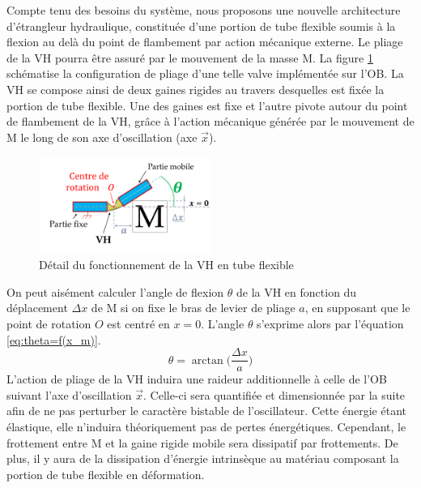 Compte tenu des besoins du système, nous proposons une nouvelle architecture d'étrangleur hydraulique, constituée d'une portion de tube flexible soumis à la flexion au delà du point de flambement par action mécanique externe. Le pliage de la VH pourra être assuré par le mouvement de la masse M. La figure \ref{fig:detail_flambement_MDOB} schématise la configuration de pliage d'une telle valve implémentée sur l'OB. La VH se compose ainsi de deux gaines rigides au travers desquelles est fixée la portion de tube flexible. Une des gaines est fixe et l'autre pivote autour du point de flambement de la VH, grâce à l'action mécanique générée par le mouvement de M le long de son axe d'oscillation (axe $\vec{x}$).
\begin{figure}[!htb]
	\begin{center}
		\captionsetup{justification=centering}
		\includegraphics[trim={2cm 2cm 3cm 1cm},clip,width=0.5\textwidth]{../Chap2/Figure/detail_flambement_MDB.pdf}
		\caption{Détail du fonctionnement de la VH en tube flexible}
		\label{fig:detail_flambement_MDOB}
	\end{center}
\end{figure}

On peut aisément calculer l'angle de flexion $\theta$ de la VH en fonction du déplacement $\Delta x$ de M si on fixe le bras de levier de pliage $a$, en supposant que le point de rotation $O$ est centré en $x=0$. L'angle $\theta$ s'exprime alors par l'équation \ref{eq:theta=f(x_m)}.
\begin{equation}
	\theta = \arctan \biggl( \frac{\Delta x}{a} \biggr)
	\label{eq:theta=f(x_m)}
\end{equation}
L'action de pliage de la VH induira une raideur additionnelle à celle de l'OB suivant l'axe d'oscillation $\vec{x}$. Celle-ci sera quantifiée et dimensionnée par la suite afin de ne pas perturber le caractère bistable de l'oscillateur. Cette énergie étant élastique, elle n'induira théoriquement pas de pertes énergétiques. Cependant, le frottement entre M et la gaine rigide mobile sera dissipatif par frottements. De plus, il y aura de la dissipation d'énergie intrinsèque au matériau composant la portion de tube flexible en déformation.

